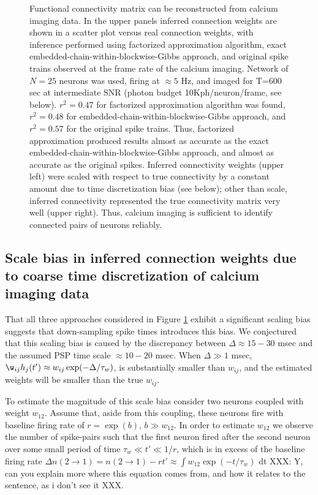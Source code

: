 \begin{figure}[h]
\caption{Functional connectivity matrix can be reconstructed from calcium imaging data. In the upper panels inferred connection weights are shown in a scatter plot versus real connection weights, with inference performed using factorized approximation algorithm, exact embedded-chain-within-blockwise-Gibbs approach, and original spike trains observed at the frame rate of the calcium imaging. Network of $N=25$ neurons was used, firing at $\approx 5$ Hz, and imaged for T=600 sec at intermediate SNR (photon budget 10Kph/neuron/frame, see below). $r^2=0.47$ for factorized approximation algorithm was found, $r^2=0.48$ for embedded-chain-within-blockwise-Gibbs approach, and $r^2=0.57$ for the original spike trains. Thus, factorized approximation produced results almost as accurate as the exact embedded-chain-within-blockwise-Gibbs approach, and almost as accurate as the original spikes. Inferred connectivity weights (upper left) were scaled with respect to true connectivity by a constant amount due to time discretization bias (see below); other than scale, inferred connectivity represented the true connectivity matrix very well (upper right). Thus, calcium imaging is sufficient to identify connected pairs of neurons reliably.} \label{fig:scatters} \end{figure}

\subsection{Scale bias in inferred connection weights due to coarse time discretization of calcium imaging data}

That all three approaches considered in Figure \ref{fig:scatters} exhibit a significant scaling bias suggests that down-sampling spike times introduces this bias.  We conjectured that this scaling bias is caused by the discrepancy between $\Delta \approx 15-30$ msec and the assumed PSP time scale $\approx 10-20$ msec. When $\Delta \gg 1$ msec, $\w_{ij} h_j(t') \approx w_{ij} \exp(-\Delta/\tau_w)$, is substantially smaller than $w_{ij}$, and the estimated weights will be smaller than the true $w_{ij}$.

To estimate the magnitude of this scale bias consider two neurons coupled with weight $w_{12}$. Assume that, aside from this coupling, these neurons fire with baseline firing rate of $r=\exp(b)$, $b \gg w_{12}$. In order to estimate $w_{12}$ we observe the number of spike-pairs such that the first neuron fired after the second neuron over some small period of time $\tau_w \ll t' \ll 1/r$, which is in excess of the baseline firing rate $\Delta n(2\rightarrow 1) = n(2\rightarrow 1) - r t' \approx \int  w_{12} \exp(-t/\tau_w)$ dt  XXX: Y, can you explain more where this equation comes from, and how it relates to the sentence, as i don't see it XXX.

